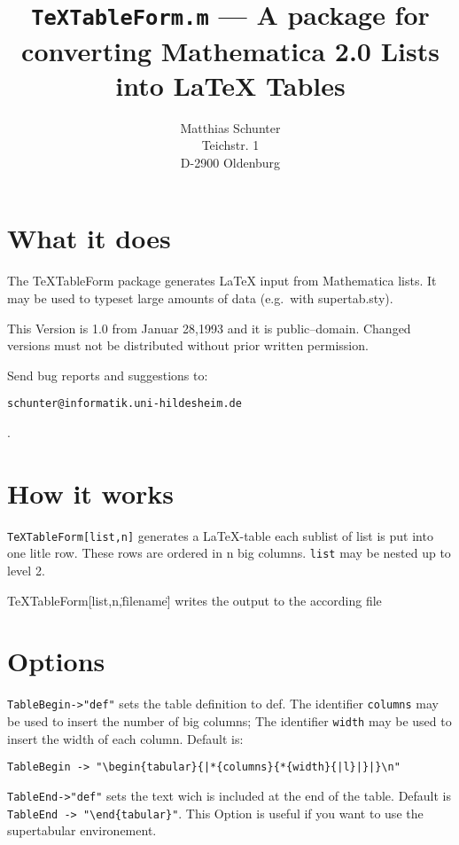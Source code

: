 

\textwidth16cm

\author{Matthias Schunter\\ Teichstr. 1\\[0.3em] D-2900 Oldenburg}
\title{{\tt TeXTableForm.m} --- A package for converting Mathematica 2.0 Lists 
into LaTeX Tables}
\maketitle
\vfill
\tableofcontents
\vfill
\vfill
\clearpage
\section{What it does}
The TeXTableForm package generates LaTeX input from Mathematica lists. 
It may be used to typeset large amounts of data 
(e.g.\ with supertab.sty).

This Version is 1.0 from Januar 28,1993 
and it is public--domain. Changed versions must not be distributed 	
without prior written permission.

Send bug reports and suggestions to:

\centerline{\verb+schunter@informatik.uni-hildesheim.de+}.

\section{How it works}
\verb+TeXTableForm[list,n]+ generates a LaTeX-table
each sublist of list is put into one litle row. 
These rows are ordered in n big columns. 
\verb+list+ may be nested up to level 2.

TeXTableForm[list,n,\"filename\"] writes the output to the according file

\section{Options}
\verb+TableBegin->"def"+ sets the table definition to def.
The identifier \verb+columns+ may be used to insert the number of big columns;
The identifier \verb+width+ may be used to insert the width of each column. 
Default is: 
\begin{verbatim}
TableBegin -> "\begin{tabular}{|*{columns}{*{width}{|l}|}|}\n"
\end{verbatim}

\verb+TableEnd->"def"+ sets the text wich is included at the end of the table.
Default is \verb+TableEnd -> "\end{tabular}"+. This Option is useful
if you want to use the supertabular environement.


